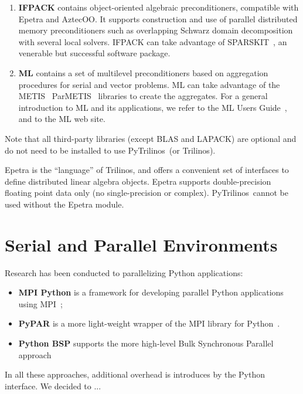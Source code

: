 \documentclass[10pt,relax]{SANDreport}
\newcommand{\PyTrilinos}{{PyTrilinos}}
\begin{document}
\begin{enumerate}
\item {\bf IFPACK} contains object-oriented algebraic preconditioners,
  compatible with Epetra and AztecOO.  It supports construction and
  use of parallel distributed memory preconditioners such as
  overlapping Schwarz domain decomposition with several local solvers.
  IFPACK can take advantage of SPARSKIT~\cite{sparskit}, an venerable
  but successful software package.

\item {\bf ML} contains a set of multilevel preconditioners based on
  aggregation procedures for serial and vector problems. ML can take
  advantage of the METIS~\cite{metis} ParMETIS~\cite{parmetis}
  libraries to create the aggregates.  For a general introduction to
  ML and its applications, we refer to the ML Users
  Guide~\cite{ml-guide}, and to the ML web site.

\end{enumerate}

Note that all third-party libraries (except BLAS and LAPACK) are
optional and do not need to be installed to use \PyTrilinos\ (or
Trilinos).

Epetra is the ``language'' of Trilinos, and offers a convenient set of
interfaces to define distributed linear algebra objects. Epetra
supports double-precision floating point data only (no
single-precision or complex).  \PyTrilinos\ cannot be used without the
Epetra module.

\section{Serial and Parallel Environments}
\label{sec:serial}

Research has been conducted to parallelizing Python applications: 
\begin{itemize}
\item {\bf MPI Python} is a framework for developing parallel Python
  applications using MPI~\cite{MPI-Python};
\item {\bf PyPAR} is a more light-weight wrapper of the MPI library
  for Python~\cite{pypar}.
\item {\bf Python BSP} supports the more high-level Bulk Synchronous
  Parallel approach~\cite{FIXME}
\end{itemize}

In all these approaches, additional overhead is introduces by the
Python interface. We decided to ...
\end{document}
